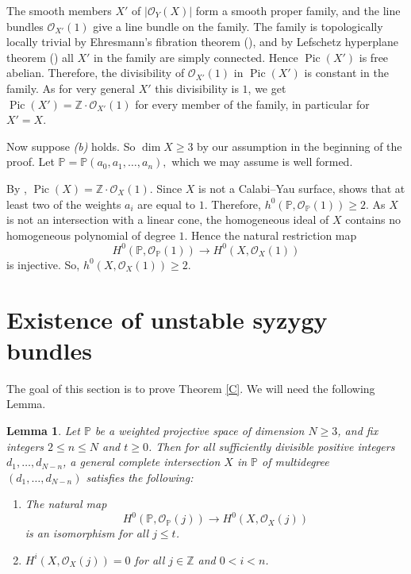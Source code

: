 \documentclass[11pt,letterpaper]{amsart}
\newtheorem{lemma}{Lemma}[section]
\begin{document}
The smooth members $X'$ of $|\mathcal O_Y(X)|$ form a smooth proper family, and
the line bundles $\mathcal O_{X'}(1)$ give a line bundle on the family.
The family is topologically locally trivial by Ehresmann's fibration theorem (\cite{ehresmann1950connexions}),
and by Lefschetz hyperplane theorem (\cite[Theorem 3.1.21]{lazarsfeld2017positivity}) all $X'$ in the family are simply connected.
Hence $\operatorname{Pic}(X')$ is free abelian. Therefore, the divisibility of
$\mathcal O_{X'}(1)$ in $\operatorname{Pic}(X')$ is constant in the family.
As for very general $X'$ this divisibility is $1$, we get $\operatorname{Pic}(X')=\mathbb Z\cdot\mathcal O_{X'}(1)$
for every member of the family, in particular for $X'=X$.

Now suppose \emph{(b)} holds. So $\dim X\ge3$ by our assumption in the
beginning of the proof. Let $\mathbb P=\mathbb P(a_0,a_1,\ldots,a_n),$
which we may assume is well formed.

By \cite[Proposition 2.3]{pizzato2017effective}, $\operatorname{Pic}(X)=\mathbb Z\cdot\mathcal O_X(1).$ Since $X$ is not a Calabi--Yau surface,
\cite[Corollary 5.3(i)]{pizzato2017effective}
shows that at least two of the weights $a_i$ are equal to $1$.
Therefore, $h^0(\mathbb P,\mathcal O_{\mathbb P}(1))\ge2.$ As $X$ is not an intersection with a linear cone, the homogeneous ideal of $X$
contains no homogeneous polynomial of degree $1$. Hence the natural restriction
map
\[
H^0(\mathbb P,\mathcal O_{\mathbb P}(1))
\longrightarrow
H^0(X,\mathcal O_X(1))
\]
is injective. So, $h^0(X,\mathcal O_X(1))\ge2.$
\section{Existence of unstable syzygy bundles}
The goal of this section is to prove Theorem \ref{C}. We will need the following Lemma.

\begin{lemma}\label{iso}
Let $\mathbb{P}$ be a weighted projective space of dimension $N\ge3$, and fix
integers $2\le n\le N$ and $t\ge0$. Then for all sufficiently divisible positive integers
$d_1,\ldots,d_{N-n}$, a general complete intersection
$X$ in $\mathbb{P}$ of multidegree
$(d_1,\ldots,d_{N-n})$ satisfies the following:

\begin{enumerate}
\item[(i)]
The natural map
\[
H^0(\mathbb{P},\mathcal{O}_{\mathbb{P}}(j))
\longrightarrow
H^0(X,\mathcal{O}_X(j))
\]
is an isomorphism for all $j\le t$.

\item[(ii)] $H^i(X,\mathcal{O}_X(j))=0$
for all $j\in\mathbb{Z}$ and $0<i<n$.
\end{enumerate}
\end{lemma}
\end{document}
